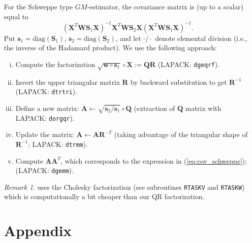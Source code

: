 \documentclass[a4paper,11pt]{scrreprt}
\theoremstyle{remark}
\newtheorem*{remark}{Remark}
\newcommand{\code}[1]{{\texttt{#1}}}
\begin{document}
\noindent For the Schweppe type $GM$-estimator, the covariance matrix is (up to a scalar) equal to
\begin{equation}\label{eq:cov_schweppe}
   (\bm X^T \bm W \bm S_1 \bm X)^{-1} \bm X^T \bm W \bm S_2 \bm X (\bm X^T \bm W \bm S_1 \bm X)^{-1}.
\end{equation}
\noindent Put $\bm s_1 = \mathrm{diag}(\bm S_1)$, $\bm s_2 = \mathrm{diag}(\bm S_2)$, and let $\cdot / \cdot $ denote elemental division (i.e., the inverse of the Hadamard product). We use the following approach:  
\begin{enumerate}[i)]
   \item Compute the factorization $\sqrt{\bm w \circ \bm s_1} \circ \bm X := \bm Q \bm R$ (LAPACK: \code{dgeqrf}).
   \item Invert the upper triangular matrix $\bm R$ by backward substitution to get $\bm R^{-1}$ (LAPACK: \code{dtrtri}).
   \item Define a new matrix: $\bm A \leftarrow \sqrt{\bm s_2 / \bm s_1 } \circ \bm Q$ (extraction of $\bm Q$ matrix with LAPACK: \code{dorgqr}).
   \item Update the matrix: $\bm A \leftarrow \bm A \bm R^{-T}$ (taking advantage of the triangular shape of $\bm R^{-1}$; LAPACK: \code{dtrmm}). 
   \item Compute $\bm A \bm A^T$, which corresponds to the expression in (\ref{eq:cov_schweppe}); (LAPACK: \code{dgemm}).  
\end{enumerate}


\begin{remark}
\citet{marazzi1987_2} uses the Cholesky factorization (see subroutines \code{RTASKV} and \code{RTASKW}) which is computationally a bit cheaper than our QR factorization. 
\end{remark}


{
\singlespacing


}


\appendix
\chapter{Appendix}

 
\end{document}
